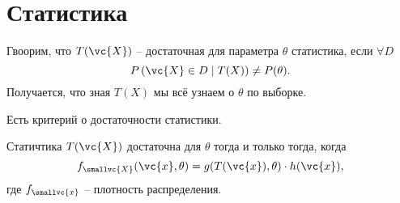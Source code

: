 


% 


\section{Статистика}

Гвоорим, что $T(\vc{X})$ -- достаточная для параметра $\theta$ статистика, если $\forall  D$ 
\begin{equation*}
    P\left(\vc{X} \in D \mid T(X)\right) \neq P(\theta).
\end{equation*}
Получается, что зная $T(X)$ мы всё узнаем о $\theta$ по выборке. 

Есть критерий о достаточности статистики. 
\begin{to_thr}
    Статичтика $T(\vc{X})$ достаточна для $\theta$ тогда и только тогда, когда
    \begin{equation*}
        f_{\smallvc{X}} (\vc{x}, \theta) = g(T(\vc{x}), \theta) \cdot h(\vc{x}),
    \end{equation*}
    где $f_{\smallvc{x}}$ -- плотность распределения. 
\end{to_thr}

